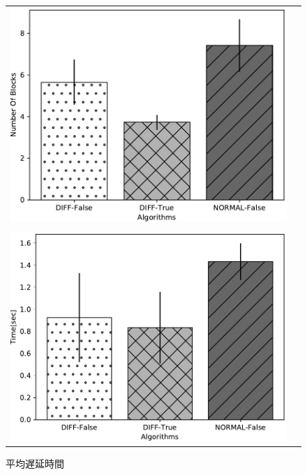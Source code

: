 \documentclass[a4j,12pt]{gradthesis_utf8}
\begin{document}
\begin{figure}[ht]
		\begin{tabular}{cc}
        	\begin{minipage}[t]{0.9\hsize}
        		\centering
        		\includegraphics[width=13cm]{figure/NumberOfBlocksStayingInBufferPub.pdf}
        		\caption{平均非有効ブロック数}
        		\label{nsbpub}
        	\end{minipage}\\ \\
			\begin{minipage}[t]{0.9\hsize}
				\includegraphics[width=13cm]{figure/AverageDelayTimePub.pdf}
				\caption{平均遅延時間}
				\label{adtpub}
			\end{minipage}
		\end{tabular}
\end{figure}
\end{document}
